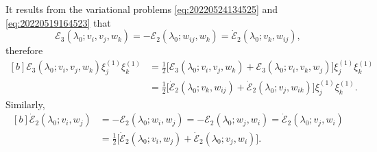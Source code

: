\documentclass[12pt, final]{scrartcl}
\theoremstyle{definition}
\newcommand{\E}{\mathcal E}
\newcommand{\order}[2][1]{#2^{(#1)}}
\begin{document}
It results from the variational problems \eqref{eq:20220524134525} and
\eqref{eq:20220519164523} that
\begin{equation*}
  \E_3(\lambda_0; v_i, v_j, w_k) = -\E_2(\lambda_0 ; w_{ij}, w_k) = \dot{\E}_2(\lambda_0; v_k, w_{ij}),
\end{equation*}
therefore
\begin{equation*}
  \begin{aligned}[b]
    \E_3(\lambda_0; v_i, v_j, w_k) \order[1]{ξ_j} \order[1]{ξ_k} &= \tfrac{1}{2} \bigl[ \E_3(\lambda_0; v_i, v_j, w_k) + \E_3(\lambda_0; v_i, v_k, w_j)\bigr] \order[1]{ξ_j} \order[1]{ξ_k}\\
                                    &= \tfrac{1}{2} \bigl[ \dot{\E}_2(\lambda_0; v_k, w_{ij}) + \dot{\E}_2(\lambda_0; v_j, w_{ik}) \bigr] \order[1]{ξ_j} \order[1]{ξ_k}.
  \end{aligned}
\end{equation*}
Similarly,
\begin{equation*}
  \begin{aligned}[b]
    \dot{\E}_2(\lambda_0; v_i, w_j) &= -\E_2(\lambda_0; w_i, w_j) = -\E_2(\lambda_0; w_j, w_i) = \dot{\E}_2(\lambda_0; v_j, w_i)\\
                           &= \tfrac{1}{2} \bigl[ \dot{\E}_2(\lambda_0; v_i, w_j) + \dot{\E}_2(\lambda_0; v_j, w_i) \bigr].
  \end{aligned}
\end{equation*}
\end{document}
